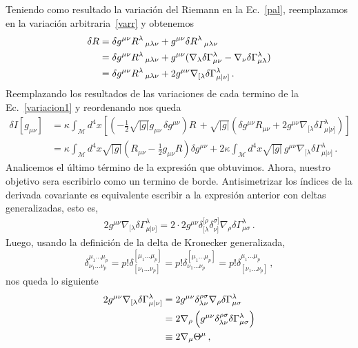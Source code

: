\documentclass[../Main.tex]{subfiles}
\begin{document}
Teniendo como resultado la variación del Riemann en la Ec.~\eqref{pal}, reemplazamos en la variación arbitraria~\eqref{varr} y obtenemos
\begin{align} \nonumber
    \delta R&=\delta g^{\mu\nu}R^{\lambda}\,_{\mu\lambda\nu}+g^{\mu\nu}\delta R^{\lambda}\,_{\mu\lambda\nu}\\ \notag
    &=\delta g^{\mu\nu}R^{\lambda}\,_{\mu\lambda\nu}+g^{\mu\nu}(\nabla_{\lambda}\delta\Gamma^{\lambda}_{\mu\nu}-\nabla_{\nu}\delta\Gamma^{\lambda}_{\mu\lambda})\\
    &=\delta g^{\mu\nu}R^{\lambda}\,_{\mu\lambda\nu}+2g^{\mu\nu}\nabla_{[\lambda}\delta\Gamma^{\lambda}_{\mu|\nu]}\, . \label{varRie}
\end{align}
Reemplazando los resultados de las variaciones de cada termino de la Ec.~\eqref{variacion1} y reordenando nos queda
\begin{align} \nonumber
     \delta I[g_{\mu\nu}]&=\kappa \int_{\mathcal{M}} d^{4}x \left[\left(-\frac{1}{2}\sqrt{\lvert g \rvert}g_{\mu\nu}\,\delta g^{\mu\nu}\right)R\,+ \sqrt{\lvert g\rvert}\left(\delta g^{\mu\nu}R_{\mu\nu}+2g^{\mu\nu}\nabla_{[\lambda}\delta\Gamma^{\lambda}_{\mu|\nu]}\right)\right] \\
     &=\kappa \int_{\mathcal{M}} d^{4}x \sqrt{\lvert g \rvert}\left(R_{\mu\nu}-\frac{1}{2}g_{\mu\nu}R\right)\delta g^{\mu\nu}+2\kappa \int_{\mathcal{M}} d^{4}x \sqrt{\lvert g \rvert}\,g^{\mu\nu}\nabla_{[\lambda}\delta\Gamma^{\lambda}_{\mu|\nu]}\,.
\end{align}
Analicemos el último término de la expresión que obtuvimos. Ahora, nuestro objetivo sera escribirlo como un termino de borde. Antisimetrizar los índices de la derivada covariante es equivalente escribir a la expresión anterior con deltas generalizadas, esto es, 
\begin{align}
2g^{\mu\nu}\nabla_{[\lambda}\delta\Gamma^{\lambda}_{\mu|\nu]}=2\cdot 2g^{\mu\nu}\delta^{[\rho}_{[\lambda}\delta^{\sigma]}_{\nu]}\nabla_{\rho}\delta\Gamma^{\lambda}_{\mu\sigma}\, .
\end{align}
Luego, usando la definición de la delta de Kronecker generalizada,
\begin{equation}
\delta^{\mu_{1}...\mu_{p}}_{\nu_{1}...\nu_{p}}=p!\delta^{[\mu_{1}...\mu_{p}]}_{[\nu_{1}...\nu_{p}]}=p!\delta^{[\mu_{1}...\mu_{p}]}_{\nu_{1}...\nu_{p}}=p!\delta^{\mu_{1}...\mu_{p}}_{[\nu_{1}...\nu_{p}]}\, ,
\end{equation}
nos queda lo siguiente
\begin{align}  \notag  2g^{\mu\nu}\nabla_{[\lambda}\delta\Gamma^{\lambda}_{\mu|\nu]}&=2g^{\mu\nu}\delta^{\rho\sigma}_{\lambda\nu}\nabla_{\rho}\delta\Gamma^{\lambda}_{\mu\sigma}\\ \notag
&=2\nabla_{\rho}\left(g^{\mu\nu}\delta^{\rho\sigma}_{\lambda\nu}\delta\Gamma^{\lambda}_{\mu\sigma}\right)\\
&\equiv 2\nabla_{\mu}\Theta^{\mu}\, ,
    \end{align}
\end{document}
